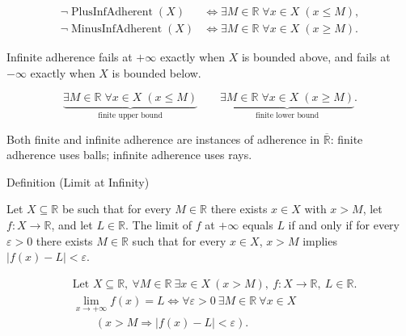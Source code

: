 \begin{remark*}
\[
\begin{aligned}
\neg\operatorname{PlusInfAdherent}(X)
&\Longleftrightarrow
\exists M\in\mathbb{R}\;\forall x\in X\;(x\le M),\\
\neg\operatorname{MinusInfAdherent}(X)
&\Longleftrightarrow
\exists M\in\mathbb{R}\;\forall x\in X\;(x\ge M).
\end{aligned}
\]
\end{remark*}

\begin{remark*}
Infinite adherence fails at $+\infty$ exactly when $X$ is bounded above,
and fails at $-\infty$ exactly when $X$ is bounded below.
\end{remark*}

\begin{remark*}
\[
\underbrace{\exists M\in\mathbb{R}\;\forall x\in X\;(x\le M)}_{\text{finite upper bound}}
\qquad
\underbrace{\exists M\in\mathbb{R}\;\forall x\in X\;(x\ge M)}_{\text{finite lower bound}}.
\]
\end{remark*}

\begin{remark*}[Interpretation]
Both finite and infinite adherence are instances of adherence in
$\overline{\mathbb{R}}$: finite adherence uses balls; infinite
adherence uses rays.
\end{remark*}

\NoLocalDependencies
\begin{definitionbox}{Definition (Limit at Infinity)}
\begin{definition}
\label{def:limit-at-infinity}
Let $X \subseteq \mathbb{R}$ be such that for every $M \in \mathbb{R}$ there exists $x \in X$ with $x > M$, let $f : X \to \mathbb{R}$, and let $L \in \mathbb{R}$. The limit of $f$ at $+\infty$ equals $L$ if and only if
for every $\varepsilon > 0$ there exists $M \in \mathbb{R}$ such that for every $x \in X$, $x > M$ implies $|f(x) - L| < \varepsilon$.
\end{definition}
\end{definitionbox}

\begin{remark*}
\[
\begin{aligned}
&\text{Let } X \subseteq \mathbb{R},\ \forall M \in \mathbb{R}\ \exists x \in X\ (x > M),\ f : X \to \mathbb{R},\ L \in \mathbb{R}.\\
&\lim_{x \to +\infty} f(x) = L \Longleftrightarrow \forall \varepsilon > 0\ \exists M \in \mathbb{R}\ \forall x \in X\\
&\qquad (x > M \Rightarrow |f(x) - L| < \varepsilon).
\end{aligned}
\]
\end{remark*}

